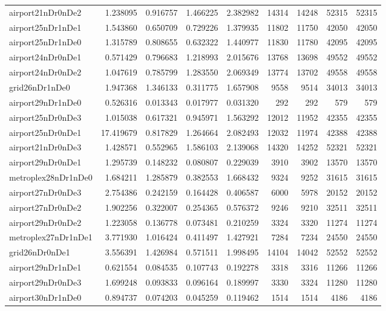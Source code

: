 \begin{longtable}{|l|r|r|r|r|r|r|r|r|}
airport21nDr0nDe2 & 1.238095 & 0.916757 & 1.466225 & 2.382982 & 14314 & 14248 & 52315 & 52315 \\
airport25nDr1nDe1 & 1.543860 & 0.650709 & 0.729226 & 1.379935 & 11802 & 11750 & 42050 & 42050 \\
airport25nDr1nDe0 & 1.315789 & 0.808655 & 0.632322 & 1.440977 & 11830 & 11780 & 42095 & 42095 \\
airport24nDr0nDe1 & 0.571429 & 0.796683 & 1.218993 & 2.015676 & 13768 & 13698 & 49552 & 49552 \\
airport24nDr0nDe2 & 1.047619 & 0.785799 & 1.283550 & 2.069349 & 13774 & 13702 & 49558 & 49558 \\
grid26nDr1nDe0 & 1.947368 & 1.346133 & 0.311775 & 1.657908 & 9558 & 9514 & 34013 & 34013 \\
airport29nDr1nDe0 & 0.526316 & 0.013343 & 0.017977 & 0.031320 & 292 & 292 & 579 & 579 \\
airport25nDr0nDe3 & 1.015038 & 0.617321 & 0.945971 & 1.563292 & 12012 & 11952 & 42355 & 42355 \\
airport25nDr0nDe1 & 17.419679 & 0.817829 & 1.264664 & 2.082493 & 12032 & 11974 & 42388 & 42388 \\
airport21nDr0nDe3 & 1.428571 & 0.552965 & 1.586103 & 2.139068 & 14320 & 14252 & 52321 & 52321 \\
airport29nDr0nDe1 & 1.295739 & 0.148232 & 0.080807 & 0.229039 & 3910 & 3902 & 13570 & 13570 \\
metroplex28nDr1nDe0 & 1.684211 & 1.285879 & 0.382553 & 1.668432 & 9324 & 9252 & 31615 & 31615 \\
airport27nDr0nDe3 & 2.754386 & 0.242159 & 0.164428 & 0.406587 & 6000 & 5978 & 20152 & 20152 \\
airport27nDr0nDe2 & 1.902256 & 0.322007 & 0.254365 & 0.576372 & 9246 & 9210 & 32511 & 32511 \\
airport29nDr0nDe2 & 1.223058 & 0.136778 & 0.073481 & 0.210259 & 3324 & 3320 & 11274 & 11274 \\
metroplex27nDr1nDe1 & 3.771930 & 1.016424 & 0.411497 & 1.427921 & 7284 & 7234 & 24550 & 24550 \\
grid26nDr0nDe1 & 3.556391 & 1.426984 & 0.571511 & 1.998495 & 14104 & 14042 & 52552 & 52552 \\
airport29nDr1nDe1 & 0.621554 & 0.084535 & 0.107743 & 0.192278 & 3318 & 3316 & 11266 & 11266 \\
airport29nDr0nDe3 & 1.699248 & 0.093833 & 0.096164 & 0.189997 & 3330 & 3324 & 11280 & 11280 \\
airport30nDr1nDe0 & 0.894737 & 0.074203 & 0.045259 & 0.119462 & 1514 & 1514 & 4186 & 4186 \\

\end{longtable}
